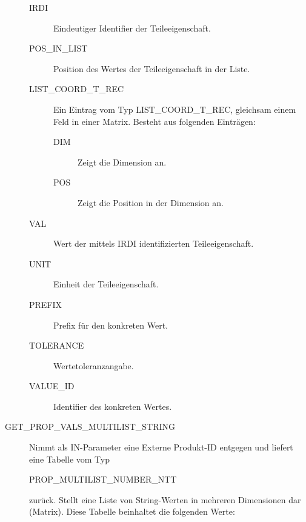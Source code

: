 \begin{description}
  \begin{description}
  \item[IRDI] Eindeutiger Identifier der Teileeigenschaft.
  \item[POS\_IN\_LIST] Position des Wertes der Teileeigenschaft in der Liste.
  \item[LIST\_COORD\_T\_REC] Ein Eintrag vom Typ LIST\_COORD\_T\_REC, gleichsam einem Feld in einer Matrix. Besteht aus folgenden Einträgen:
    \begin{description}	
    \item[DIM] Zeigt die Dimension an.
    \item[POS] Zeigt die Position in der Dimension an. 
    \end{description}
  \item[VAL] Wert der mittels IRDI identifizierten Teileeigenschaft.
  \item[UNIT] Einheit der Teileeigenschaft.
  \item[PREFIX] Prefix für den konkreten Wert.
  \item[TOLERANCE] Wertetoleranzangabe.
  \item[VALUE\_ID] Identifier des konkreten Wertes.
  \end{description}

\item[GET\_PROP\_VALS\_MULTILIST\_STRING]  Nimmt als IN-Parameter eine Externe Produkt-ID entgegen und liefert eine Tabelle vom Typ 

PROP\_MULTILIST\_NUMBER\_NTT 

zurück. Stellt eine Liste von String-Werten in mehreren Dimensionen dar (Matrix). 
Diese Tabelle beinhaltet die folgenden Werte: 


\end{description}
